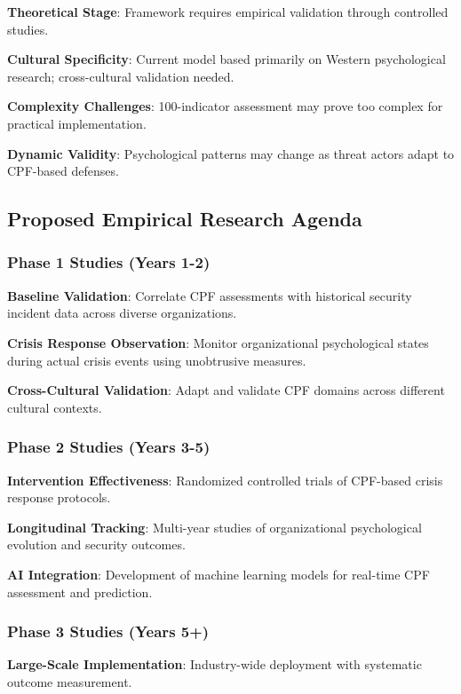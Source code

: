 \documentclass[11pt,a4paper]{article}
\begin{document}
\textbf{Theoretical Stage}: Framework requires empirical validation through controlled studies.

\textbf{Cultural Specificity}: Current model based primarily on Western psychological research; cross-cultural validation needed.

\textbf{Complexity Challenges}: 100-indicator assessment may prove too complex for practical implementation.

\textbf{Dynamic Validity}: Psychological patterns may change as threat actors adapt to CPF-based defenses.

\subsection{Proposed Empirical Research Agenda}

\subsubsection{Phase 1 Studies (Years 1-2)}

\textbf{Baseline Validation}: Correlate CPF assessments with historical security incident data across diverse organizations.

\textbf{Crisis Response Observation}: Monitor organizational psychological states during actual crisis events using unobtrusive measures.

\textbf{Cross-Cultural Validation}: Adapt and validate CPF domains across different cultural contexts.

\subsubsection{Phase 2 Studies (Years 3-5)}

\textbf{Intervention Effectiveness}: Randomized controlled trials of CPF-based crisis response protocols.

\textbf{Longitudinal Tracking}: Multi-year studies of organizational psychological evolution and security outcomes.

\textbf{AI Integration}: Development of machine learning models for real-time CPF assessment and prediction.

\subsubsection{Phase 3 Studies (Years 5+)}

\textbf{Large-Scale Implementation}: Industry-wide deployment with systematic outcome measurement.
\end{document}
